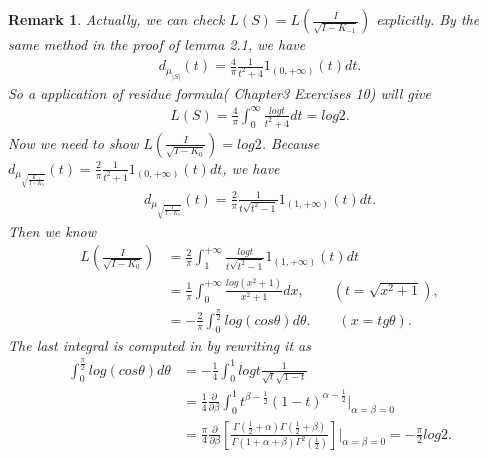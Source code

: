 \documentclass{amsart}
\newtheorem{remark}{Remark}[section]
\begin{document}
\begin{remark}
Actually, we can check $L(S) = L(\frac{I}{\sqrt{I - K_{-1}}})$ explicitly. By the same method in the proof of lemma 2.1,
we have
\begin{align*}
d_{\mu_{|S|}}(t) = \frac{4}{\pi} \frac{1}{t^2 + 4} 1_{(0, +\infty)}(t)dt.
\end{align*}
So a application of residue formula(\cite{SS} Chapter3 Exercises 10) will give
\begin{align*}
L(S) = \frac{4}{\pi}\int_{0}^{\infty} \frac{log t}{t^2 + 4} dt = log2.
\end{align*}
Now we need to show $L(\frac{I}{\sqrt{I - K_{0}}}) = log2$. Because
$d_{\mu_{\sqrt{\frac{K_{-1}}{I - K_{0}}}}}(t) = \frac{2}{\pi} \frac{1}{t^2 + 1} 1_{(0, +\infty)}(t)dt$,
we have
\begin{align*}
d_{\mu_{\sqrt{\frac{I}{I - K_{0}}}}}(t) = \frac{2}{\pi} \frac{1}{t\sqrt{t^2 - 1}} 1_{(1, +\infty)}(t)dt.
\end{align*}
Then we know
\begin{align*}
L(\frac{I}{\sqrt{I - K_{0}}}) &= \frac{2}{\pi} \int_{1}^{+\infty} \frac{log t}{t\sqrt{t^2 - 1}} 1_{(1, +\infty)}(t)dt \\
                               &= \frac{1}{\pi} \int_{0}^{+\infty} \frac{log(x^2+1)}{x^2 + 1} dx, \qquad (t = \sqrt{x^2 + 1}),\\
                               &= -\frac{2}{\pi} \int_{0}^{\frac{\pi}{2}} log(cos \theta) d\theta. \qquad (x = tg \theta).
\end{align*}
The last integral is computed in \cite{MR} by rewriting it as
\begin{align*}
\int_{0}^{\frac{\pi}{2}} log(cos \theta) d\theta &= -\frac{1}{4} \int_{0}^{1} log t \frac{1}{\sqrt{t}\sqrt{1-t}}\\
                                                 &= \frac{1}{4} \frac{\partial}{\partial \beta} \int_{0}^{1} t^{\beta - \frac{1}{2}}(1-t)^{\alpha - \frac{1}{2}} |_{\alpha = \beta = 0} \\
                                                 & = \frac{\pi}{4} \frac{\partial}{\partial \beta} [\frac{\Gamma(\frac{1}{2} + \alpha)\Gamma(\frac{1}{2} + \beta)}{\Gamma(1 + \alpha + \beta)\Gamma^{2}(\frac{1}{2})}]|_{\alpha = \beta = 0} = -\frac{\pi}{2}log2.
\end{align*}
\end{remark}
\end{document}
